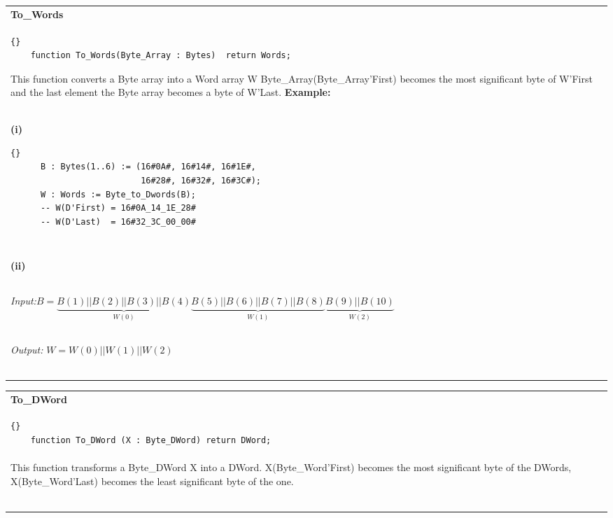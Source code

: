 \begin{tabular}{p{\textwidth}}
  \textbf{To\_Words}\ \\
  \begin{lstlisting}{}
    function To_Words(Byte_Array : Bytes)  return Words;
  \end{lstlisting}
  This function converts a Byte array into a Word array W
  Byte\_Array(Byte\_Array'First) becomes the most significant byte
  of W'First and the last element the Byte array becomes a byte of W'Last. 
  \textbf{Example:}\\
  \textbf{(i)}
\begin{lstlisting}{}
      B : Bytes(1..6) := (16#0A#, 16#14#, 16#1E#, 
                          16#28#, 16#32#, 16#3C#);
      W : Words := Byte_to_Dwords(B);
      -- W(D'First) = 16#0A_14_1E_28#
      -- W(D'Last)  = 16#32_3C_00_00#
    \end{lstlisting}\\ \ \\
  \textbf{(ii)}\\ \ \\
    \textit{Input:}$B=\underbrace{B(1)||B(2)||B(3)||B(4)}_{W(0)}
    \underbrace{B(5)||B(6)||B(7)||B(8)}_{W(1)}
    \underbrace{B(9)||B(10)}_{W(2)}$\\ \ \\
    \textit{Output:} $W=W(0)||W(1)||W(2)$\\ \ \\
    \hline\\
\end{tabular}



\begin{tabular}{p{\textwidth}}
  \textbf{To\_DWord}\ \\
  \begin{lstlisting}{} 
    function To_DWord (X : Byte_DWord) return DWord;
  \end{lstlisting}\\
  This function transforms a Byte\_DWord X into a DWord.
  X(Byte\_Word'First) becomes the most significant byte of the DWords,
  X(Byte\_Word'Last) becomes the least significant byte of the one.\\ \ \\
  \hline\\
\end{tabular}

  
